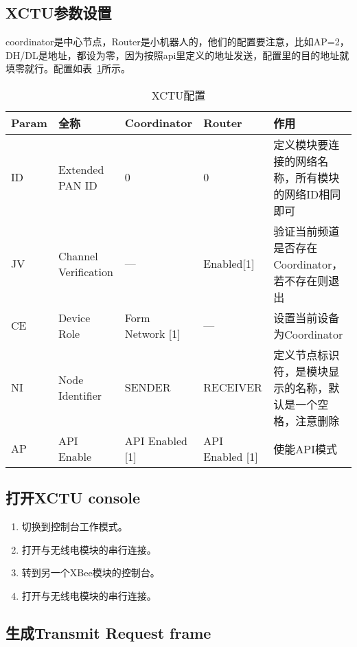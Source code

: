 \subsection{XCTU参数设置}

coordinator是中心节点，Router是小机器人的，他们的配置要注意，比如AP=2，DH/DL是地址，都设为零，因为按照api里定义的地址发送，配置里的目的地址就填零就行。配置如表~\ref{tab:XCTU}所示。

\begin{table}[htbp]
    \centering
    \begin{tabular}{@{}lllll@{}}
    \toprule
    Param  & 全称  & Coordinator & Router & 作用 \\ \midrule
    ID &  Extended PAN ID      &  0                    & 0                   & 定义模块要连接的网络名称，所有模块的网络ID相同即可 \\
    JV &  Channel Verification &  —                    & Enabled{[}1{]}      & 验证当前频道是否存在Coordinator，若不存在则退出 \\
    CE &  Device Role          &  Form Network {[}1{]} & —                   & 设置当前设备为Coordinator \\
    NI &  Node Identifier      &  SENDER               & RECEIVER            & 定义节点标识符，是模块显示的名称，默认是一个空格，注意删除 \\
    AP &  API Enable           &  API Enabled {[}1{]}  & API Enabled {[}1{]} & 使能API模式 \\ \bottomrule
    \end{tabular}
    \caption{XCTU配置}
    \label{tab:XCTU}
\end{table}

\subsection{打开XCTU console}

\begin{enumerate}
    \item 切换到控制台工作模式。
    \item 打开与无线电模块的串行连接。
    \item 转到另一个XBee模块的控制台。
    \item 打开与无线电模块的串行连接。
\end{enumerate}

\subsection{生成Transmit Request frame}

